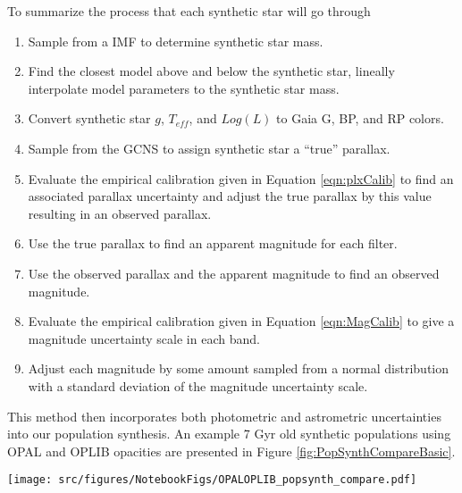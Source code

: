 To summarize the process that each synthetic star will go through
\begin{enumerate}
	\item Sample from a \citet{Sollima2019} IMF to determine synthetic star mass.
	\item Find the closest model above and below the synthetic star, lineally
		interpolate model parameters to the synthetic star mass.
	\item Convert synthetic star $g$, $T_{eff}$, and $Log(L)$ to Gaia G, BP,
		and RP colors.
	\item Sample from the GCNS to assign synthetic star a ``true'' parallax.
	\item Evaluate the empirical calibration given in Equation
		\ref{eqn:plxCalib} to find an associated parallax uncertainty and
		adjust the true parallax by this value resulting in an observed
		parallax.
	\item Use the true parallax to find an apparent magnitude for each filter.
	\item Use the observed parallax and the apparent magnitude to find an
		observed magnitude.
	\item Evaluate the empirical calibration given in Equation
		\ref{eqn:MagCalib} to give a magnitude uncertainty scale in each band.
	\item Adjust each magnitude by some amount sampled from a normal
		distribution with a standard deviation of the magnitude uncertainty
		scale.
\end{enumerate}

This method then incorporates both photometric and astrometric uncertainties
into our population synthesis. An example 7 Gyr old synthetic populations
using OPAL and OPLIB opacities are presented in Figure
\ref{fig:PopSynthCompareBasic}.

\begin{figure*}
	\centering
	\texttt{[image: src/figures/NotebookFigs/OPALOPLIB\_popsynth\_compare.pdf]}
	\caption{Population synthesis results for models evolved with OPAL (left)
	and models evolved with OPLIB (right). A Gaussian kernel-density estimate
	has been overlaid to better highlight the density variations.}
	\label{fig:PopSynthCompareBasic}
\end{figure*}

